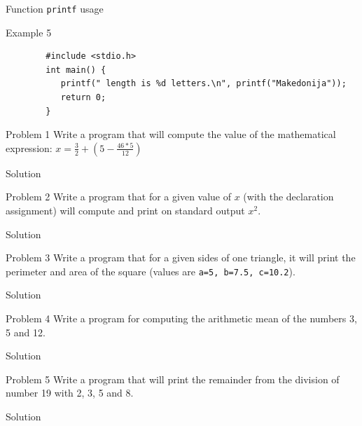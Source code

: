\begin{frame}[fragile]{Function \texttt{printf} usage}
    \begin{exampleblock}{Example 5}
        \begin{lstlisting}
        #include <stdio.h>
        int main() {
           printf(" length is %d letters.\n", printf("Makedonija"));
           return 0;
        }
        \end{lstlisting}
    \end{exampleblock}
\end{frame}

\begin{frame}[fragile]{Problem 1}
    Write a program that will compute the value of the mathematical expression:
    $ x = \frac{3}{2} + (5 - \frac{46 * 5}{12})$
    \begin{exampleblock}{Solution}
    
    \end{exampleblock}
\end{frame}

\begin{frame}[fragile]{Problem 2}
Write a program that for a given value of $ x $ (with the declaration
assignment) will compute and print on standard output $ x^2 $.
    \begin{exampleblock}{Solution}
    
    \end{exampleblock}
\end{frame}

\begin{frame}[fragile]{Problem 3}
Write a program that for a given sides of one triangle, it will print the
perimeter and area of the square (values are \texttt{a=5, b=7.5,
c=10.2}).
    \begin{exampleblock}{Solution}
            
    \end{exampleblock}
\end{frame}

\begin{frame}[fragile]{Problem 4}
Write a program for computing the arithmetic mean of the numbers 3, 5 and 12.
    \begin{exampleblock}{Solution}
    
    \end{exampleblock}
\end{frame}

\begin{frame}[fragile]{Problem 5}
Write a program that will print the remainder from the division of number 19
with 2, 3, 5 and 8.
    \begin{exampleblock}{Solution}
            
    \end{exampleblock}
\end{frame}

